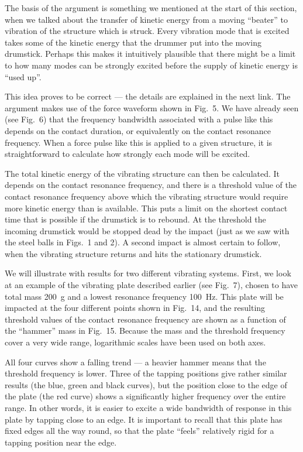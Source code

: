   The basis of the argument is something we mentioned at the start of this 
  section, when we talked about the transfer of kinetic energy from a moving 
  “beater” to vibration of the structure which is struck. Every vibration mode 
  that is excited takes some of the kinetic energy that the drummer put into 
  the moving drumstick. Perhaps this makes it intuitively plausible that there 
  might be a limit to how many modes can be strongly excited before the supply 
  of kinetic energy is “used up”. 

  This idea proves to be correct — the details are explained in the next link. 
  The argument makes use of the force waveform shown in Fig.\ 5. We have 
  already seen (see Fig.\ 6) that the frequency bandwidth associated with a 
  pulse like this depends on the contact duration, or equivalently on the 
  contact resonance frequency. When a force pulse like this is applied to a 
  given structure, it is straightforward to calculate how strongly each mode 
  will be excited. 

  The total kinetic energy of the vibrating structure can then be calculated. 
  It depends on the contact resonance frequency, and there is a threshold value 
  of the contact resonance frequency above which the vibrating structure would 
  require more kinetic energy than is available. This puts a limit on the 
  shortest contact time that is possible if the drumstick is to rebound. At the 
  threshold the incoming drumstick would be stopped dead by the impact (just as 
  we saw with the steel balls in Figs.\ 1 and 2). A second impact is almost 
  certain to follow, when the vibrating structure returns and hits the 
  stationary drumstick. 

  We will illustrate with results for two different vibrating systems. First, 
  we look at an example of the vibrating plate described earlier (see Fig.\ 7), 
  chosen to have total mass 200~g and a lowest resonance frequency 100~Hz. This 
  plate will be impacted at the four different points shown in Fig.\ 14, and 
  the resulting threshold values of the contact resonance frequency are shown 
  as a function of the “hammer” mass in Fig.\ 15. Because the mass and the 
  threshold frequency cover a very wide range, logarithmic scales have been 
  used on both axes. 

  All four curves show a falling trend — a heavier hammer means that the 
  threshold frequency is lower. Three of the tapping positions give rather 
  similar results (the blue, green and black curves), but the position close to 
  the edge of the plate (the red curve) shows a significantly higher frequency 
  over the entire range. In other words, it is easier to excite a wide 
  bandwidth of response in this plate by tapping close to an edge. It is 
  important to recall that this plate has fixed edges all the way round, so 
  that the plate “feels” relatively rigid for a tapping position near the edge. 


